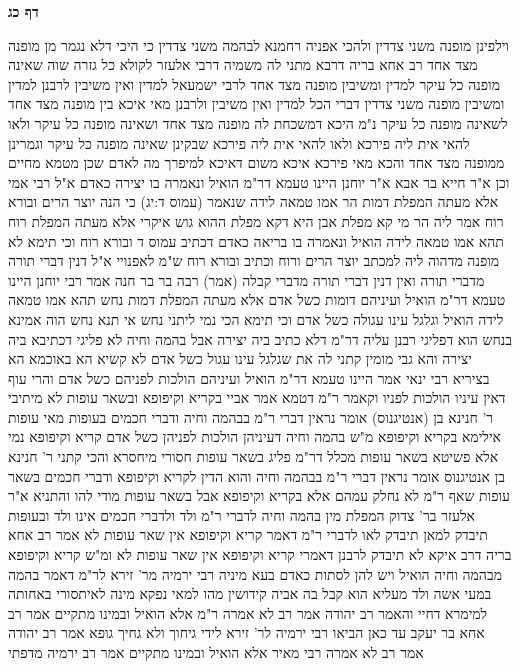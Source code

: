 \documentclass[12pt, openany]{book}
\newcommand{\sethebfont}{
\fontsize{10.5pt}{21.0pt} \selectfont
}
\newcommand{\twocol}[1]{
	{\sethebfont \begin{multicols}{2}
			#1
	\end{multicols}}	
}
\newcommand{\sectname}{}
\newcommand{\newsection}[1]{
	\addcontentsline{toc}{section}{#1}
	\renewcommand{\sectname}{#1}	
	\vspace{-\baselineskip}
	\begin{center}
		\textbf{%
\fontsize{16pt}{16pt}\selectfont
			#1}
	\end{center}
	\vspace{-\baselineskip}
	\nopagebreak
}
\begin{document}
\newsection{דף כג}
\twocol{וילפינן מופנה משני צדדין  ולהכי אפניה רחמנא לבהמה משני צדדין כי היכי דלא נגמר מן מופנה מצד אחד 
רב אחא בריה דרבא מתני לה משמיה דרבי אלעזר לקולא  כל גזרה שוה שאינה מופנה כל עיקר למדין ומשיבין  מופנה מצד אחד לרבי ישמעאל למדין ואין משיבין לרבנן למדין ומשיבין  מופנה משני צדדין דברי הכל למדין ואין משיבין 
ולרבנן מאי איכא בין מופנה מצד אחד לשאינה מופנה כל עיקר 
נ"מ היכא דמשכחת לה מופנה מצד אחד ושאינה מופנה כל עיקר ולאו להאי אית ליה פירכא ולאו להאי אית ליה פירכא שבקינן שאינה מופנה כל עיקר וגמרינן ממופנה מצד אחד 
והכא מאי פירכא איכא  משום דאיכא למיפרך  מה לאדם שכן מטמא מחיים 
וכן א"ר חייא בר אבא א"ר יוחנן  היינו טעמא דר"מ הואיל ונאמרה בו יצירה כאדם 
א"ל רבי אמי  אלא מעתה המפלת דמות הר אמו טמאה לידה שנאמר  (עמוס ד:יג) כי הנה יוצר הרים ובורא רוח  אמר ליה  הר מי קא מפלת  אבן היא דקא מפלת ההוא גוש איקרי
אלא מעתה המפלת רוח תהא אמו טמאה לידה הואיל ונאמרה בו בריאה כאדם דכתיב {עמוס ד } ובורא רוח  וכי תימא  לא מופנה מדהוה ליה למכתב יוצר הרים ורוח וכתיב ובורא רוח ש"מ לאפנויי 
א"ל  דנין דברי תורה מדברי תורה ואין דנין דברי תורה מדברי קבלה 
(אמר) רבה בר בר חנה אמר רבי יוחנן  היינו טעמא דר"מ הואיל ועיניהם דומות כשל אדם 
אלא מעתה המפלת דמות נחש תהא אמו טמאה לידה הואיל וגלגל עינו עגולה כשל אדם  וכי תימא  הכי נמי ליתני נחש 
אי תנא נחש הוה אמינא  בנחש הוא דפליגי רבנן עליה דר"מ דלא כתיב ביה יצירה אבל בהמה וחיה לא פליגי דכתיבא ביה יצירה 
והא גבי מומין קתני לה את שגלגל עינו עגול כשל אדם  לא קשיא הא באוכמא הא בציריא 
רבי ינאי אמר  היינו טעמא דר"מ הואיל ועיניהם הולכות לפניהם כשל אדם  והרי עוף דאין עיניו הולכות לפניו וקאמר ר"מ דטמא  אמר אביי  בקריא וקיפופא ובשאר עופות לא 
מיתיבי  ר' חנינא בן (אנטיגנוס) אומר  נראין דברי ר"מ בבהמה וחיה ודברי חכמים בעופות
מאי עופות  אילימא בקריא וקיפופא מ"ש בהמה וחיה דעיניהן הולכות לפניהן כשל אדם קריא וקיפופא נמי 
אלא פשיטא בשאר עופות מכלל דר"מ פליג בשאר עופות 
חסורי מיחסרא והכי קתני ר' חנינא בן אנטיגנוס אומר  נראין דברי ר"מ בבהמה וחיה והוא הדין לקריא וקיפופא ודברי חכמים בשאר עופות שאף ר"מ לא נחלק עמהם אלא בקריא וקיפופא אבל בשאר עופות מודי להו 
והתניא א"ר אלעזר בר' צדוק  המפלת מין בהמה וחיה לדברי ר"מ ולד ולדברי חכמים אינו ולד ובעופות תיבדק 
למאן תיבדק  לאו לדברי ר"מ דאמר קריא וקיפופא אין שאר עופות לא 
אמר רב אחא בריה דרב איקא  לא תיבדק לרבנן דאמרי קריא וקיפופא אין שאר עופות לא 
ומ"ש קריא וקיפופא מבהמה וחיה  הואיל ויש להן לסתות כאדם 
בעא מיניה רבי ירמיה מר' זירא  לר"מ דאמר בהמה במעי אשה ולד מעליא הוא קבל בה אביה קידושין מהו  למאי נפקא מינה לאיתסורי באחותה 
למימרא דחיי  והאמר רב יהודה אמר רב  לא אמרה ר"מ אלא הואיל ובמינו מתקיים  אמר רב אחא בר יעקב  עד כאן הביאו רבי ירמיה לר' זירא לידי גיחוך ולא גחיך 
גופא אמר רב יהודה אמר רב  לא אמרה רבי מאיר אלא הואיל ובמינו  מתקיים אמר רב ירמיה מדפתי
}
\end{document}
